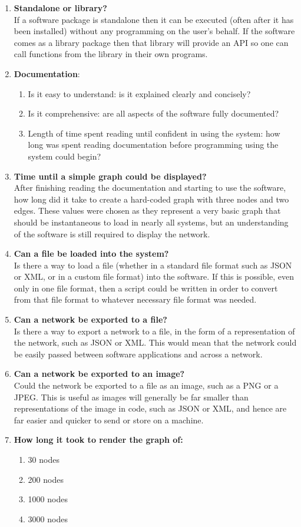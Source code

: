\documentclass[../dissertation.tex]{subfiles}
\begin{document}
\begin{enumerate}
	\item \textbf{Standalone or library?}\\
	If a software package is standalone then it can be executed (often after it has been installed) without any programming on the user's behalf. If the software comes as a library package then that library will provide an API so one can call functions from the library in their own programs. 
	\item \textbf{Documentation}:
	\begin{enumerate}
		\item Is it easy to understand: is it explained clearly and concisely?
		\item Is it comprehensive: are all aspects of the software fully documented?
		\item Length of time spent reading until confident in using the system: how long was spent reading documentation before programming using the system could begin?
	\end{enumerate}
	\item \textbf{Time until a simple graph could be displayed?}\\
	After finishing reading the documentation and starting to use the software, how long did it take to create a hard-coded graph with three nodes and two edges. These values were chosen as they represent a very basic graph that should be instantaneous to load in nearly all systems, but an understanding of the software is still required to display the network.
	\item \textbf{Can a file be loaded into the system?}\\
	Is there a way to load a file (whether in a standard file format such as JSON or XML, or in a custom file format) into the software. If this is possible, even only in one file format, then a script could be written in order to convert from that file format to whatever necessary file format was needed. 
	\item \textbf{Can a network be exported to a file?}\\
	Is there a way to export a network to a file, in the form of a representation of the network, such as JSON or XML. This would mean that the network could be easily passed between software applications and across a network.
	\item \textbf{Can a network be exported to an image?}\\
	Could the network be exported to a file as an image, such as a PNG or a JPEG. This is useful as images will generally be far smaller than representations of the image in code, such as JSON or XML, and hence are far easier and quicker to send or store on a machine.
	\item \textbf{How long it took to render the graph of:}
	\begin{enumerate}
	    \item 30 nodes
	    \item 200 nodes
	    \item 1000 nodes
	    \item 3000 nodes
	\end{enumerate}
	

\end{enumerate}
\end{document}
